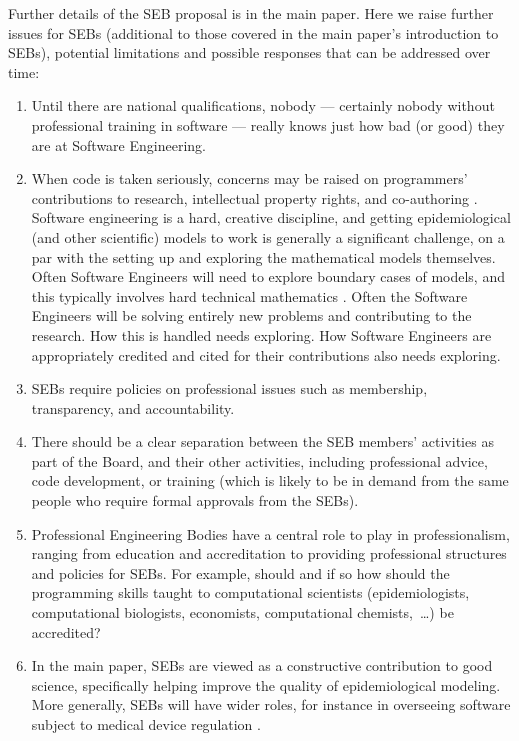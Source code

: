 \documentclass[10pt,a4paper]{article}
\begin{document}
Further details of the SEB proposal is in the main paper. Here we raise further issues for SEBs (additional to those covered in the main paper's introduction to SEBs), potential limitations and possible responses that can be addressed over time:

\begin{enumerate}\raggedright
\item 
Until there are national qualifications, nobody --- certainly nobody without professional training in software --- really knows just how bad (or good) they are at Software Engineering.

\item
When code is taken seriously, concerns may be raised on programmers' contributions to research, intellectual property rights, and co-authoring \cite{vancouver}. Software engineering is a hard, creative discipline, and getting epidemiological (and other scientific) models to work is generally a significant challenge, on a par with the setting up and exploring the mathematical models themselves. Often Software Engineers will need to explore boundary cases of models, and this typically involves hard technical mathematics \cite{hamming}. Often the Software Engineers will be solving entirely new problems and contributing to the research. How this is handled needs exploring. How Software Engineers are appropriately credited and cited for their contributions also needs exploring.

\item 
SEBs require policies on professional issues such as membership, transparency, and accountability.
 
\item
There should be a clear separation between the SEB members' activities as part of the Board, and their other activities, including professional advice, code development, or training (which is likely to be in demand from the same people who require formal approvals from the SEBs).

\item
Professional Engineering Bodies have a central role to play in professionalism, ranging from education and accreditation to providing professional structures and policies for SEBs. For example, should and if so how should the programming skills taught to computational scientists (epidemiologists, computational biologists, economists, computational chemists,~\ldots\@) be accredited?

\item
In the main paper, SEBs are viewed as a constructive contribution to good science, specifically helping improve the quality of epidemiological modeling. More generally, SEBs will have wider roles, for instance in overseeing software subject to medical device regulation \cite{fixit}.


\end{enumerate}
\end{document}
